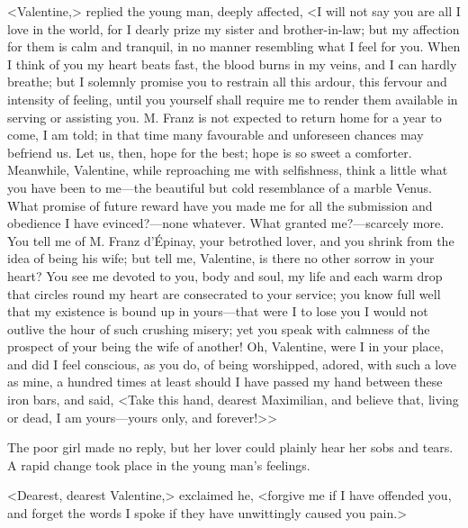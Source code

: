  <Valentine,> replied the young man, deeply affected, <I will not say you are all I love in the world, for I dearly prize my sister and brother-in-law; but my affection for them is calm and tranquil, in no manner resembling what I feel for you. When I think of you my heart beats fast, the blood burns in my veins, and I can hardly breathe; but I solemnly promise you to restrain all this ardour, this fervour and intensity of feeling, until you yourself shall require me to render them available in serving or assisting you. M. Franz is not expected to return home for a year to come, I am told; in that time many favourable and unforeseen chances may befriend us. Let us, then, hope for the best; hope is so sweet a comforter. Meanwhile, Valentine, while reproaching me with selfishness, think a little what you have been to me—the beautiful but cold resemblance of a marble Venus. What promise of future reward have you made me for all the submission and obedience I have evinced?—none whatever. What granted me?—scarcely more. You tell me of M. Franz d'Épinay, your betrothed lover, and you shrink from the idea of being his wife; but tell me, Valentine, is there no other sorrow in your heart? You see me devoted to you, body and soul, my life and each warm drop that circles round my heart are consecrated to your service; you know full well that my existence is bound up in yours—that were I to lose you I would not outlive the hour of such crushing misery; yet you speak with calmness of the prospect of your being the wife of another! Oh, Valentine, were I in your place, and did I feel conscious, as you do, of being worshipped, adored, with such a love as mine, a hundred times at least should I have passed my hand between these iron bars, and said, <Take this hand, dearest Maximilian, and believe that, living or dead, I am yours—yours only, and forever!>> 

 The poor girl made no reply, but her lover could plainly hear her sobs and tears. A rapid change took place in the young man's feelings. 

 <Dearest, dearest Valentine,> exclaimed he, <forgive me if I have offended you, and forget the words I spoke if they have unwittingly caused you pain.> 

